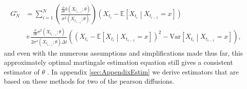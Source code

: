 \begin{align}
    G_N^{\circ} &= \sum_{i = 1}^N 
    \left(
        \frac{\frac{\partial}{\partial\theta} b\left(X_{t_{i-1}};\theta\right)}{\sigma^2\left(X_{t_{i-1}};\theta\right)}
    \right) \left(X_{t_{i}} - \mathbb{E}\left[X_{t_{i}} \middle| X_{t_{i-1}} = x\right]\right) \nonumber \\
    &+ \frac{\frac{\partial}{\partial\theta}\sigma^2\left(X_{t_{i-1}}; \theta\right)}{2\sigma^4\left(X_{t_{i - 1}}; \theta\right)\Delta t}\left(\left(X_{t_{i}} - \mathbb{E}\left[X_{t_{i}} \middle| X_{t_{i-1}} = x\right]\right)^2 - \textrm{Var}\left[X_{t_{i}} \middle| X_{t_{i-1}} = x\right]\right),\label{eq:approximatelyOptimalMartingale}
\end{align}
and even with the numerous assumptions and simplifications made thus far, this approximately optimal martingale estimation equation still gives a consistent estimator of $\theta$ \cite[p.19]{StatisticalMethodsForSDE}. In appendix \ref{sec:AppendixEstim} we derive estimators that are based on these methods for two of the pearson diffusions.
